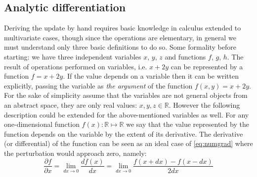 \subsection{Analytic differentiation}
Deriving the update by hand requires basic knowledge in calculus extended to multivariate cases, though since the operations are elementary, in general we must understand only three basic definitions to do so. 
Some formality before starting: we have three independent variables $x$, $y$, $z$ and functions $f$, $g$, $h$. The result of operations performed on variables, i.e. $x+2y$ can be represented by a function $f=x+2y$. 
If the value depends on a variable then it can be written explicitly, passing the variable as \emph{the argument} of the function $f(x,y)=x+2y$. 
For the sake of simplicity assume that the variables are not general objects from an abstract space, they are only real values: $x,y,z\in \mathbb{R}$. However the following description could be extended for the above-mentioned variables as well. For any one-dimensional function $f(x):\mathbb{R}\mapsto\mathbb{R}$ we say that the value represented by the function depends on the variable by the extent of its derivative. The derivative (or differential) of the function can be seen as an ideal case of \ref{eq:numgrad} where the perturbation would approach zero, namely:
\begin{equation}
    \frac{\partial f}{\partial x} = \lim_{dx\rightarrow 0}\frac{df(x)}{dx}= \lim_{dx\rightarrow 0} \frac{f(x+dx)-f(x-dx)}{2dx}
\end{equation}
